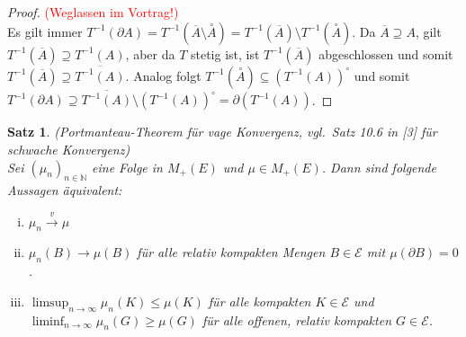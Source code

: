 \documentclass[twoside]{article}
\newcounter{lecnum}
\newtheorem{theorem}{Satz}[lecnum]
\theoremstyle{definition}
\begin{document}
\begin{proof} \textcolor{red}{(Weglassen im Vortrag!)}\\
Es gilt immer $T^{-1} (\partial A) = T^{-1} \left( \overline{A} \setminus \stackrel{\circ}{A} \right) = T^{-1}(\overline{A}) \setminus T^{-1}\left(\stackrel{\circ}{A} \right)$. Da $\overline{A} \supseteq A$, gilt $T^{-1}(\overline{A}) \supseteq T^{-1}(A)$, aber da $T$ stetig ist, ist $T^{-1}(\overline{A})$ abgeschlossen und somit $T^{-1}(\overline{A}) \supseteq \overline{T^{-1}(A)}$. Analog folgt $T^{-1}(\stackrel{\circ}{A}) \subseteq \left(T^{-1}(A)\right)^\circ$ und somit
$ T^{-1} (\partial A) \supseteq \overline{T^{-1}(A)} \setminus \left(T^{-1}(A)\right)^\circ = \partial \left(T^{-1}(A) \right)$.
\end{proof}
\begin{theorem} (Portmanteau-Theorem für vage Konvergenz, vgl.\ Satz 10.6 in [3] für schwache Konvergenz)\\
Sei $(\mu_n)_{n \in \mathbb{N}}$ eine Folge in $M_+(E)$ und $\mu \in M_+(E)$. Dann sind folgende Aussagen äquivalent:
\begin{enumerate}[(i)]
\item $\mu_n \xrightarrow{v} \mu$
\item $\mu_n(B) \to \mu(B)$ für alle relativ kompakten Mengen $B \in \mathcal{E}$ mit $\mu(\partial B) = 0$.
\item $\limsup_{n \to \infty} \mu_n(K) \leq \mu(K)$ für alle kompakten $K \in \mathcal{E}$ und $\liminf_{n \to \infty} \mu_n(G) \geq \mu(G)$ für alle offenen, relativ kompakten $G \in \mathcal{E}$.
\end{enumerate}
\end{theorem}
\end{document}
